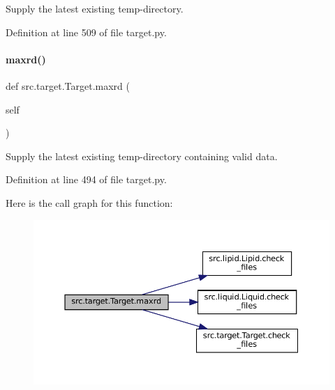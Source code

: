 Supply the latest existing temp-\/directory. 



Definition at line 509 of file target.\+py.

\mbox{\label{classsrc_1_1target_1_1Target_ac295603ea071c6b6db55b7c2cf89890a}} 
\paragraph{\texorpdfstring{maxrd()}{maxrd()}}
{\footnotesize\ttfamily def src.\+target.\+Target.\+maxrd (\begin{DoxyParamCaption}\item[{}]{self }\end{DoxyParamCaption})\hspace{0.3cm}{\ttfamily [inherited]}}



Supply the latest existing temp-\/directory containing valid data. 



Definition at line 494 of file target.\+py.

Here is the call graph for this function\+:
\nopagebreak
\begin{figure}[H]
\begin{center}
\leavevmode
\includegraphics[width=350pt]{classsrc_1_1target_1_1Target_ac295603ea071c6b6db55b7c2cf89890a_cgraph}
\end{center}
\end{figure}
\mbox{\label{classsrc_1_1target_1_1Target_a14ccb9a63ebc92a83ead58965f13fcc7}} 
